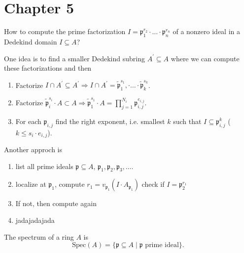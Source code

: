\documentclass[a4paper]{book}
\theoremstyle{break}
\theoremstyle{plain}
\begin{document}
\section{Chapter 5}

How to compute the prime factorization \(I = \mathfrak{p}_1^{r_2} \cdot \ldots \cdot \mathfrak{p}_n^{r_n}\) of a nonzero ideal in a Dedekind domain \(I \subseteq A\)?

One idea is to find a smaller Dedekind subring \(A^\prime \subseteq A\) where we can compute these factorizations and then

\begin{enumerate}
    \item Factorize \(I \cap A^\prime \subseteq A^\prime \Rightarrow I \cap A^\prime = \tilde{\mathfrak{p}}_1^{s_1}, \cdot \ldots \cdot \tilde{\mathfrak{p}}_k^{s_k}\).
    \item Factorize \(\tilde{\mathfrak{p}}_i^{s_i} \cdot A \subset A \Rightarrow \tilde{\mathfrak{p}}_1^{s_1} \cdot A = \prod_{j=1}^{N_i} \mathfrak{p}_{i, j}^{e_{i, j}}\).
    \item For each \(\mathfrak{p}_{i, j}\) find the right exponent, i.e. smallest \(k\) such that \(I \subseteq \mathfrak{p}_{i, j}^k\) (\(k \leq s_i \cdot e_{i, j}\)).
\end{enumerate}

Another approch is

\begin{enumerate}
    \item list all prime ideals \(\mathfrak{p} \subseteq A\), \(\mathfrak{p}_1, \mathfrak{p}_2, \mathfrak{p}_3, \ldots\).
    \item localize at \(\mathfrak{p}_1\), compute \(r_1 = v_{\mathfrak{p}_1} (I \cdot A_{\mathfrak{p}_1})\) check if \(I = \mathfrak{p}_2^{r_1}\)
    \item If not, then compute again
    \item jadajadajada
\end{enumerate}

\begin{definition}
    The spectrum of a ring \(A\) is
    \begin{equation}
        \text{Spec}(A) = \{\mathfrak{p} \subseteq A \mid \mathfrak{p} \text{ prime ideal}\}.
    \end{equation}
\end{definition}

\newpage
\end{document}
